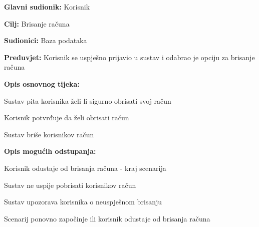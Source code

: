 					\noindent {}
					\begin{packed_item}
	
						\item \textbf{Glavni sudionik: }Korisnik
						\item  \textbf{Cilj:} Brisanje računa
						\item  \textbf{Sudionici:} Baza podataka
						\item  \textbf{Preduvjet:} Korisnik se uspješno prijavio u sustav i odabrao je opciju za brisanje računa
						\eject
						\item  \textbf{Opis osnovnog tijeka:}
						
						\item[] \begin{packed_enum}
							\item Sustav pita korisnika želi li sigurno obrisati svoj račun
							\item Korisnik potvrđuje da želi obrisati račun
							\item Sustav briše korisnikov račun
						\end{packed_enum}

						\item  \textbf{Opis mogućih odstupanja:}

						\item[] \begin{packed_item}
							\item[2.a] Korisnik odustaje od brisanja računa - kraj scenarija
							\item[3.a] Sustav ne uspije pobrisati korisnikov račun
							\item[] \begin{packed_enum}
								\item Sustav upozorava korisnika o neuspješnom brisanju
								\item Scenarij ponovno započinje ili korisnik odustaje od brisanja računa
							\end{packed_enum}					
						\end{packed_item}
					\end{packed_item}	

